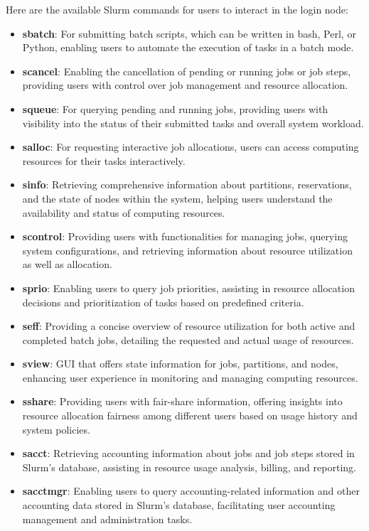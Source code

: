 Here are the available Slurm commands for users to interact in the login node:

\begin{itemize}
    \item \textbf{sbatch}: For submitting batch scripts, which can be written in bash, Perl, or Python, enabling users to automate the execution of tasks in a batch mode.
    \item \textbf{scancel}: Enabling the cancellation of pending or running jobs or job steps, providing users with control over job management and resource allocation.
    \item \textbf{squeue}: For querying pending and running jobs, providing users with visibility into the status of their submitted tasks and overall system workload.
    \item \textbf{salloc}: For requesting interactive job allocations, users can access computing resources for their tasks interactively.
    \item \textbf{sinfo}: Retrieving comprehensive information about partitions, reservations, and the state of nodes within the system, helping users understand the availability and status of computing resources.
    \item \textbf{scontrol}: Providing users with functionalities for managing jobs, querying system configurations, and retrieving information about resource utilization as well as allocation.
    \item \textbf{sprio}: Enabling users to query job priorities, assisting in resource allocation decisions and prioritization of tasks based on predefined criteria.
    \item \textbf{seff}: Providing a concise overview of resource utilization for both active and completed batch jobs, detailing the requested and actual usage of resources.
    \item \textbf{sview}: GUI that offers state information for jobs, partitions, and nodes, enhancing user experience in monitoring and managing computing resources.
    \item \textbf{sshare}: Providing users with fair-share information, offering insights into resource allocation fairness among different users based on usage history and system policies.
    \item \textbf{sacct}: Retrieving accounting information about jobs and job steps stored in Slurm's database, assisting in resource usage analysis, billing, and reporting.
    \item \textbf{sacctmgr}: Enabling users to query accounting-related information and other accounting data stored in Slurm's database, facilitating user accounting management and administration tasks.

\end{itemize}

